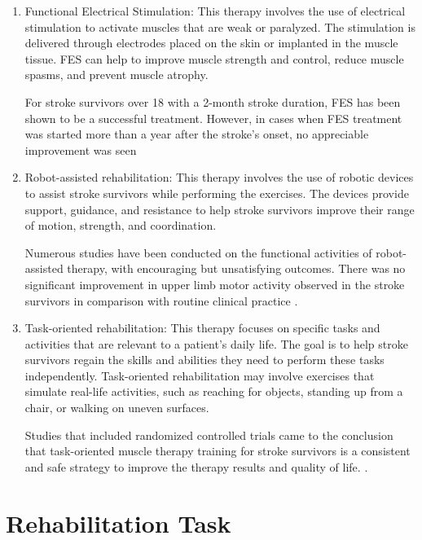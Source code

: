\begin{enumerate}

    \item Functional Electrical Stimulation: This therapy involves the use of electrical stimulation to activate muscles that are weak or paralyzed. The stimulation is delivered through electrodes placed on the skin or implanted in the muscle tissue. FES can help to improve muscle strength and control, reduce muscle spasms, and prevent muscle atrophy. 

    For stroke survivors over 18 with a 2-month stroke duration, FES has been shown to be a successful treatment. However, in cases when FES treatment was started more than a year after the stroke's onset, no appreciable improvement was seen \cite{Alon2007}
    
    \item Robot-assisted rehabilitation: This therapy involves the use of robotic devices to assist stroke survivors while performing the exercises. The devices provide support, guidance, and resistance to help stroke survivors improve their range of motion, strength, and coordination.
    
    Numerous studies have been conducted on the functional activities of robot-assisted therapy, with encouraging but unsatisfying outcomes. There was no significant improvement in upper limb motor activity observed in the stroke survivors in comparison with routine clinical practice \cite{Masiero2014}.

    \item Task-oriented rehabilitation: This therapy focuses on specific tasks and activities that are relevant to a patient's daily life. The goal is to help stroke survivors regain the skills and abilities they need to perform these tasks independently. Task-oriented rehabilitation may involve exercises that simulate real-life activities, such as reaching for objects, standing up from a chair, or walking on uneven surfaces.

    Studies that included randomized controlled trials came to the conclusion that task-oriented muscle therapy training for stroke survivors is a consistent and safe strategy to improve the therapy results and quality of life. \cite{Rensink2009}.


    
\end{enumerate}


\section{Rehabilitation Task} \label{rehabilitation_task}

